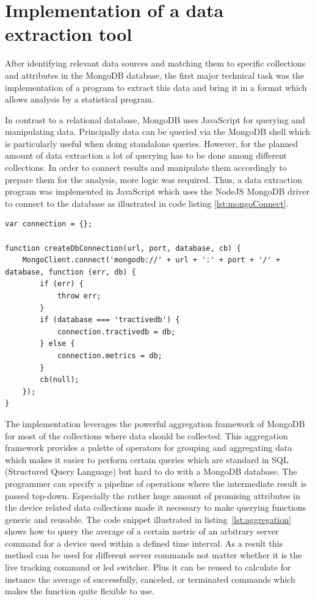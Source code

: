\section{Implementation of a data extraction tool}
\label{sec:extractionTool}
After identifying relevant data sources and matching them to specific collections and attributes in the MongoDB database, the first major technical task was the implementation of a program to extract this data and bring it in a format which allows analysis by a statistical program. 

In contrast to a relational database, MongoDB uses JavaScript for querying and manipulating data. Principally data can be queried via the MongoDB shell which is particularly useful when doing standalone queries. However, for the planned amount of data extraction a lot of querying has to be done among different collections. In order to connect results and manipulate them accordingly to prepare them for the analysis, more logic was required. Thus, a data extraction program was implemented in JavaScript which uses the NodeJS MongoDB driver to connect to the database as illustrated in code listing \ref{lst:mongoConnect}.

\begin{lstlisting}[caption={Connecting to the database via MongoDB NodeJS driver}, label={lst:mongoConnect}]
var connection = {};

function createDbConnection(url, port, database, cb) {
	MongoClient.connect('mongodb://' + url + ':' + port + '/' + database, function (err, db) {
		if (err) {
			throw err;
		}
		if (database === 'tractivedb') {
			connection.tractivedb = db;
		} else {
			connection.metrics = db;
		}
		cb(null);
	});
}
\end{lstlisting}

The implementation leverages the powerful aggregation framework of MongoDB for most of the collections where data should be collected. This aggregation framework provides a palette of operators for grouping and aggregating data which makes it easier to perform certain queries which are standard in SQL (Structured Query Language) but hard to do with a MongoDB database. The programmer can specify a pipeline of operations where the intermediate result is passed top-down. Especially the rather huge amount of promising attributes in the device related data collections made it necessary to make querying functions generic and reusable. The code snippet illustrated in listing~\ref{lst:aggregation} shows how to query the average of a certain metric of an arbitrary server command for a device used within a defined time interval. As a result this method can be used for different server commands not matter whether it is the live tracking command or led switcher. Plus it can be reused to calculate for instance the average of successfully, canceled, or terminated commands which makes the function quite flexible to use. 

